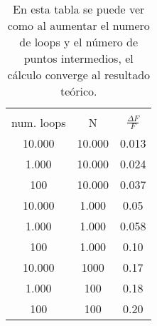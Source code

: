 \begin{table}
\begin{center}
 \begin{tabular}{|| c c c||} 
 \hline \\ 
 num. loops & N & $\frac{ \Delta F}{F}$ \\ [0.5ex] 
 \hline\hline
  10.000 & 10.000& 0.013 \\ 
 \hline
  1.000 & 10.000 & 0.024 \\
 \hline
  100 & 10.000 & 0.037\\
 \hline
  10.000 & 1.000 & 0.05 \\
 \hline
  1.000 & 1.000 & 0.058 \\ 
 \hline
   100 & 1.000 & 0.10 \\
 \hline
  10.000 & 1000 & 0.17\\
 \hline
  1.000 & 100 & 0.18 \\
 \hline
   100 & 100 & 0.20 \\ [1ex] 
 \hline
\end{tabular}
\end{center}
\caption{En esta tabla se puede ver como al aumentar el numero de loops y el número de puntos intermedios, el cálculo converge al resultado teórico.}
\label{table:1}
\end{table}
